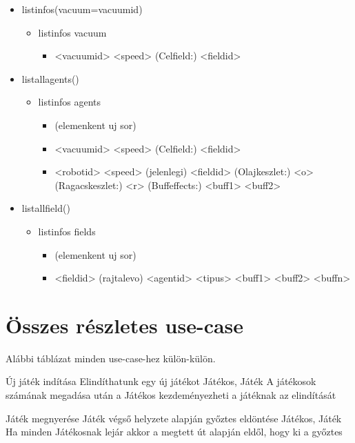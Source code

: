 \begin{itemize}
	\item listinfos(vacuum=vacuumid)
	\begin{itemize}
		\item listinfos vacuum
		\begin{itemize}
			\item <vacuumid> <speed> (Celfield:) <fieldid>
		\end{itemize}
	\end{itemize}		
	
	\item listallagents()
	\begin{itemize}
		\item listinfos agents
		\begin{itemize}
			\item (elemenkent uj sor)
			\item <vacuumid> <speed> (Celfield:) <fieldid>
			\item <robotid> <speed> (jelenlegi) <fieldid> (Olajkeszlet:) <o> (Ragacskeszlet:) <r> (Buffeffects:) <buff1> <buff2>
		\end{itemize}
	\end{itemize}	
	
	\item listallfield()
	\begin{itemize}
		\item listinfos fields
		\begin{itemize}
			\item (elemenkent uj sor)			
			\item <fieldid> (rajtalevo) <agentid> <tipus> <buff1> <buff2> <buffn> 
		\end{itemize}
	\end{itemize}	
	
	
\end{itemize}


\section{Összes részletes use-case}
Alábbi táblázat minden use-case-hez külön-külön.

\usecase%
{Új játék indítása}%
{Elindíthatunk egy új játékot}%
{Játékos, Játék}%
{A játékosok számának megadása után a Játékos kezdeményezheti a játéknak az elindítását}

\usecase%
{Játék megnyerése}%
{Játék végső helyzete alapján győztes eldöntése}%
{Játékos, Játék}%
{Ha minden Játékosnak lejár akkor a megtett út alapján eldől, hogy ki a győztes}

